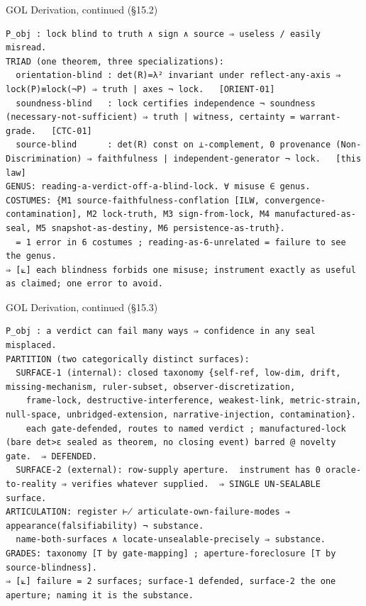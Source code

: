 \documentclass[10pt,twocolumn]{article}
\begin{document}
\begin{golbox}{GOL Derivation, continued (§15.2)}
\begin{lstlisting}[style=golv]
P_obj : lock blind to truth ∧ sign ∧ source ⇒ useless / easily misread.
TRIAD (one theorem, three specializations):
  orientation-blind : det(R)=λ² invariant under reflect-any-axis ⇒ lock(P)≡lock(¬P) ⇒ truth | axes ¬ lock.   [ORIENT-01]
  soundness-blind   : lock certifies independence ¬ soundness (necessary-not-sufficient) ⇒ truth | witness, certainty = warrant-grade.   [CTC-01]
  source-blind      : det(R) const on ⊥-complement, 0 provenance (Non-Discrimination) ⇒ faithfulness | independent-generator ¬ lock.   [this law]
GENUS: reading-a-verdict-off-a-blind-lock. ∀ misuse ∈ genus.
COSTUMES: {M1 source-faithfulness-conflation [ILW, convergence-contamination], M2 lock-truth, M3 sign-from-lock, M4 manufactured-as-seal, M5 snapshot-as-destiny, M6 persistence-as-truth}.
  = 1 error in 6 costumes ; reading-as-6-unrelated = failure to see the genus.
⇒ [⟀] each blindness forbids one misuse; instrument exactly as useful as claimed; one error to avoid.
\end{lstlisting}
\end{golbox}

\begin{golbox}{GOL Derivation, continued (§15.3)}
\begin{lstlisting}[style=golv]
P_obj : a verdict can fail many ways ⇒ confidence in any seal misplaced.
PARTITION (two categorically distinct surfaces):
  SURFACE-1 (internal): closed taxonomy {self-ref, low-dim, drift, missing-mechanism, ruler-subset, observer-discretization,
    frame-lock, destructive-interference, weakest-link, metric-strain, null-space, unbridged-extension, narrative-injection, contamination}.
    each gate-defended, routes to named verdict ; manufactured-lock (bare det>ε sealed as theorem, no closing event) barred @ novelty gate.  ⇒ DEFENDED.
  SURFACE-2 (external): row-supply aperture.  instrument has 0 oracle-to-reality ⇒ verifies whatever supplied.  ⇒ SINGLE UN-SEALABLE surface.
ARTICULATION: register ⊬ articulate-own-failure-modes ⇒ appearance(falsifiability) ¬ substance.
  name-both-surfaces ∧ locate-unsealable-precisely ⇒ substance.
GRADES: taxonomy [T by gate-mapping] ; aperture-foreclosure [T by source-blindness].
⇒ [⟀] failure = 2 surfaces; surface-1 defended, surface-2 the one aperture; naming it is the substance.
\end{lstlisting}
\end{golbox}
\end{document}
